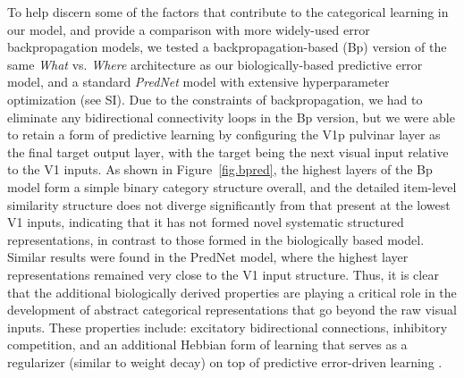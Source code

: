 \documentclass[11pt,twoside]{article}
\newif\myifpdf
\begin{document}
To help discern some of the factors that contribute to the categorical learning in our model, and provide a comparison with more widely-used error backpropagation models, we tested a backpropagation-based (Bp) version of the same \emph{What} vs. \emph{Where} architecture as our biologically-based predictive error model, and a standard \emph{PredNet} model \cite{LotterKreimanCox16} with extensive hyperparameter optimization (see SI).  Due to the constraints of backpropagation, we had to eliminate any bidirectional connectivity loops in the Bp version, but we were able to retain a form of predictive learning by configuring the V1p pulvinar layer as the final target output layer, with the target being the next visual input relative to the V1 inputs.  As shown in Figure~\ref{fig.bpred}, the highest layers of the Bp model form a simple binary category structure overall, and the detailed item-level similarity structure does not diverge significantly from that present at the lowest V1 inputs, indicating that it has not formed novel systematic structured representations, in contrast to those formed in the biologically based model.  Similar results were found in the PredNet model, where the highest layer representations remained very close to the V1 input structure.  Thus, it is clear that the additional biologically derived properties are playing a critical role in the development of abstract categorical representations that go beyond the raw visual inputs. These properties include: excitatory bidirectional connections, inhibitory competition, and an additional Hebbian form of learning that serves as a regularizer (similar to weight decay) on top of predictive error-driven learning \cite{OReilly98,OReillyMunakata00}.
\end{document}
